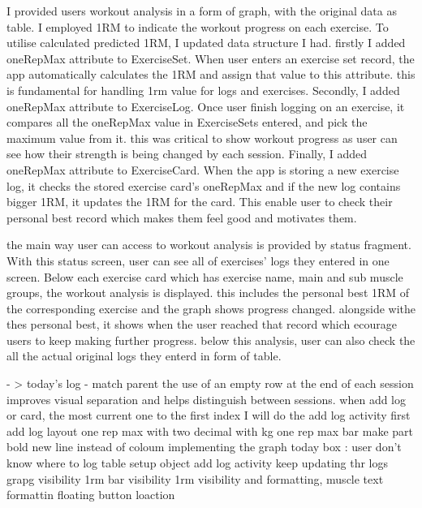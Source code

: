 


I provided users workout analysis in a form of graph, with the original data as table.
I employed 1RM to indicate the workout progress on each exercise.
To utilise calculated predicted 1RM, I updated data structure I had.
firstly I added oneRepMax attribute to ExerciseSet.
When user enters an exercise set record, the app automatically calculates the 1RM and assign that value to this attribute.
this is fundamental for handling 1rm value for logs and exercises.
Secondly, I added oneRepMax attribute to ExerciseLog.
Once user finish logging on an exercise, it compares all the oneRepMax value in ExerciseSets entered, and pick the maximum value from it.
this was critical to show workout progress as user can see how their strength is being changed by each session.
Finally, I added oneRepMax attribute to ExerciseCard.
When the app is storing a new exercise log, it checks the stored exercise card's oneRepMax and if the new log contains bigger 1RM, it updates the 1RM for the card.
This enable user to check their personal best record which makes them feel good and motivates them.

the main way user can access to workout analysis is provided by status fragment.
With this status screen, user can see all of exercises' logs they entered in one screen.
Below each exercise card which has exercise name, main and sub muscle groups, the workout analysis is displayed.
this includes the personal best 1RM of the corresponding exercise and the graph shows progress changed.
alongside withe thes personal best, it shows when the user reached that record which ecourage users to keep making further progress. 
below this analysis, user can also check the all the actual original logs they enterd in form of table.


- > today's log - match parent
the use of an empty row at the end of each session improves visual separation and helps distinguish between sessions.
when add log or card, the most current one to the first index
I will do the add log activity first
add log layout
one rep max with two decimal with kg
one rep max bar
make part bold
new line instead of coloum
implementing the graph
today box : user don't know where to log
table setup object
add log activity keep updating thr logs
grapg visibility
1rm bar visibility
1rm visibility and formatting, muscle text formattin
floating button loaction

